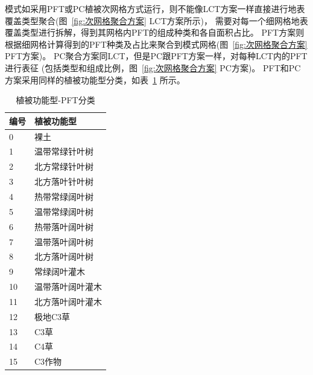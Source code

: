 模式如采用PFT或PC植被次网格方式运行，则不能像LCT方案一样直接进行地表覆盖类型聚合(图~\ref{fig:次网格聚合方案} LCT方案所示)，
需要对每一个细网格地表覆盖类型进行拆解，得到其网格内PFT的组成种类和各自面积占比。
PFT方案则根据细网格计算得到的PFT种类及占比来聚合到模式网格(图~\ref{fig:次网格聚合方案} PFT方案)。
PC聚合方案同LCT，但是PC跟PFT方案一样，对每种LCT内的PFT进行表征 (包括类型和组成比例，图~\ref{fig:次网格聚合方案} PC方案)。
PFT和PC方案采用同样的植被功能型分类，如表~\ref{tab:PFT分类} 所示。
\begin{table}[htbp]
\centering
\caption{植被功能型-PFT分类}
\label{tab:PFT分类}
\begin{tabular}{ll}
\toprule
\multicolumn{1}{l}{编号} & \multicolumn{1}{l}{植被功能型} \\ \midrule
0                      & 裸土                        \\
1                      & 温带常绿针叶树                   \\
2                      & 北方常绿针叶树                   \\
3                      & 北方落叶针叶树                   \\
4                      & 热带常绿阔叶树                   \\
5                      & 温带常绿阔叶树                   \\
6                      & 热带落叶阔叶树                   \\
7                      & 温带落叶阔叶树                   \\
8                      & 北方落叶阔叶树                   \\
9                      & 常绿阔叶灌木                    \\
10                     & 温带落叶阔叶灌木                  \\
11                     & 北方落叶阔叶灌木                  \\
12                     & 极地C3草                     \\
13                     & C3草                       \\
14                     & C4草                       \\
15                     & C3作物                      \\ \bottomrule
\end{tabular}
\end{table}

